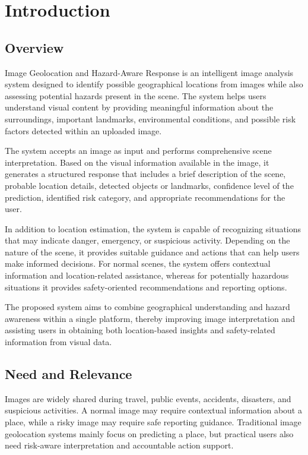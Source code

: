 \chapter{Introduction}

\section{Overview}
Image Geolocation and Hazard-Aware Response is an intelligent image analysis system designed to identify possible geographical locations from images while also assessing potential hazards present in the scene. The system helps users understand visual content by providing meaningful information about the surroundings, important landmarks, environmental conditions, and possible risk factors detected within an uploaded image.

The system accepts an image as input and performs comprehensive scene interpretation. Based on the visual information available in the image, it generates a structured response that includes a brief description of the scene, probable location details, detected objects or landmarks, confidence level of the prediction, identified risk category, and appropriate recommendations for the user.

In addition to location estimation, the system is capable of recognizing situations that may indicate danger, emergency, or suspicious activity. Depending on the nature of the scene, it provides suitable guidance and actions that can help users make informed decisions. For normal scenes, the system offers contextual information and location-related assistance, whereas for potentially hazardous situations it provides safety-oriented recommendations and reporting options.

The proposed system aims to combine geographical understanding and hazard awareness within a single platform, thereby improving image interpretation and assisting users in obtaining both location-based insights and safety-related information from visual data.

\section{Need and Relevance}
Images are widely shared during travel, public events, accidents, disasters, and suspicious activities. A normal image may require contextual information about a place, while a risky image may require safe reporting guidance. Traditional image geolocation systems mainly focus on predicting a place, but practical users also need risk-aware interpretation and accountable action support.

